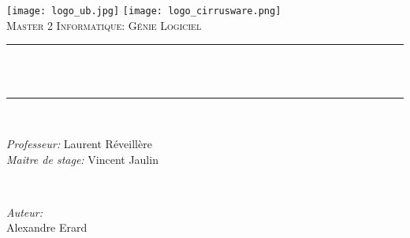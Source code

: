 \begin{titlepage}
	\centering
    \vspace*{0.5 cm}
    \texttt{[image: logo\_ub.jpg]}	%
    \texttt{[image: logo\_cirrusware.png]}\\[1.0 cm]	%
	\textsc{\Large Master 2 Informatique: Génie Logiciel}\\[0.5 cm]				%
	\rule{\linewidth}{0.2 mm} \\[0.4 cm]
	{ \huge \bfseries \thetitle}\\
	\rule{\linewidth}{0.2 mm} \\[1.5 cm]
	
	\begin{minipage}{0.5\textwidth}
		\begin{flushleft} \large
			\emph{Professeur:}
			Laurent Réveillère\\
			\emph{Maitre de stage:}
            Vincent Jaulin\\
			\end{flushleft}
			\end{minipage}~
			\begin{minipage}{0.4\textwidth}
            
			\begin{flushright} \large
                \emph{Auteur:}\\
			Alexandre Erard\\
		\end{flushright}
        
	\end{minipage}\\[2 cm]
	
	
    \thedate
\end{titlepage}

